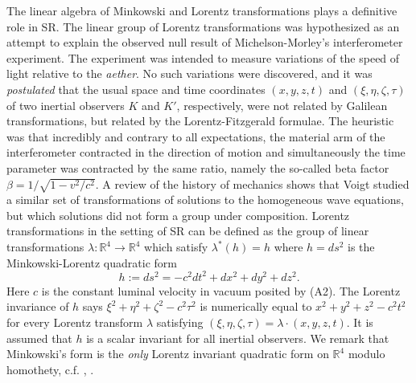 \documentclass[12pt]{article}
\newcommand{\bR}{\mathbb{R}}
\begin{document}
The linear algebra of Minkowski and Lorentz transformations plays a definitive role in SR. The linear group of Lorentz transformations was hypothesized as an attempt to explain the observed null result of Michelson-Morley's interferometer experiment. The experiment was intended to measure variations of the speed of light relative to the \emph{aether}. No such variations were discovered, and it was \emph{postulated} that the usual space and time coordinates $(x,y,z,t)$ and $(\xi, \eta, \zeta, \tau)$ of two inertial observers $K$ and $K'$, respectively, were not related by Galilean transformations, but related by the Lorentz-Fitzgerald formulae. The heuristic was that incredibly and contrary to all expectations, the material arm of the interferometer contracted in the direction of motion and simultaneously the time parameter was contracted by the same ratio, namely the so-called beta factor $\beta = 1/\sqrt{1-v^2/c^2}$. A review of the history of mechanics \cite{dugas} shows that Voigt studied a similar set of transformations of solutions to the homogeneous wave equations, but which solutions did not form a group under composition. Lorentz transformations in the setting of SR can be defined as the group of linear transformations $\lambda: \bR^{4} \to \bR^4$ which satisfy $\lambda^*(h)=h$ where $h=ds^2$ is the Minkowski-Lorentz quadratic form \begin{equation}\label{mform}
h:=ds^2=-c^2dt^2+dx^2+dy^2+dz^2.\end{equation} 
Here $c$ is the constant luminal velocity in vacuum posited by (A2). The Lorentz invariance of $h$ says $\xi^2+\eta^2+\zeta^2-c^2 \tau^2$ is numerically equal to $x^2+y^2+z^2-c^2 t^2$ for every Lorentz transform $\lambda$ satisfying $(\xi, \eta, \zeta, \tau)=\lambda \cdot (x,y,z,t)$. It is assumed that $h$ is a scalar invariant for all inertial observers. We remark that Minkowski's form is the \emph{only} Lorentz invariant quadratic form on $\bR^4$ modulo homothety, c.f. \cite{elton2010indefinite}, \cite{arminjon2018lorentz}. 




\end{document}
